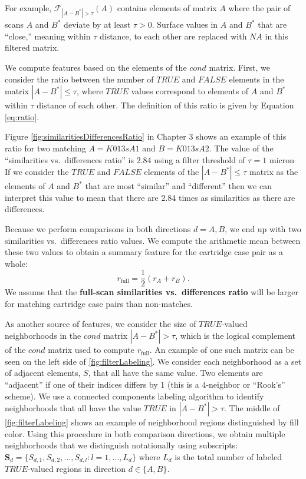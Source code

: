 \documentclass[11pt,]{isuthesis}
\begin{document}
For example, \(\mathcal{F}_{|A - B^*| > \tau}(A)\) contains elements of matrix \(A\) where the pair of scans \(A\) and \(B^*\) deviate by at least \(\tau > 0\).
Surface values in \(A\) and \(B^*\) that are ``close,'' meaning within \(\tau\) distance, to each other are replaced with \(NA\) in this filtered matrix.

We compute features based on the elements of the \(cond\) matrix.
First, we consider the ratio between the number of \(TRUE\) and \(FALSE\) elements in the matrix \(|A - B^*| \leq \tau\), where \(TRUE\) values correspond to elements of \(A\) and \(B^*\) within \(\tau\) distance of each other.
The definition of this ratio is given by Equation \eqref{eq:ratio}.

Figure \ref{fig:similaritiesDifferencesRatio} in Chapter 3 shows an example of this ratio for two matching \(A = K013sA1\) and \(B = K013sA2\).
The value of the ``similarities vs.~differences ratio'' is 2.84 using a filter threshold of \(\tau = 1\) micron
If we consider the \(TRUE\) and \(FALSE\) elements of the \(|A - B^*| \leq \tau\) matrix as the elements of \(A\) and \(B^*\) that are most ``similar'' and ``different'' then we can interpret this value to mean that there are 2.84 times as similarities as there are differences.

Because we perform comparisons in both directions \(d = A,B\), we end up with two similarities vs.~differences ratio values.
We compute the arithmetic mean between these two values to obtain a summary feature for the cartridge case pair as a whole:
\[
r_{\text{full}} = \frac{1}{2}(r_A + r_B).
\]
We assume that the \textbf{full-scan similarities vs.~differences ratio} will be larger for matching cartridge case pairs than non-matches.

As another source of features, we consider the size of \(TRUE\)-valued neighborhoods in the \(cond\) matrix \(|A - B^*| > \tau\), which is the logical complement of the \(cond\) matrix used to compute \(r_{\text{full}}\).
An example of one such matrix can be seen on the left side of \ref{fig:filterLabeling}.
We consider each neighborhood as a set of adjacent elements, \(S\), that all have the same value.
Two elements are ``adjacent'' if one of their indices differs by 1 (this is a 4-neighbor or ``Rook's'' scheme).
We use a connected components labeling algorithm \citep{hesselink_concurrent_2001} to identify neighborhoods that all have the value \(TRUE\) in \(|A - B^*| > \tau\).
The middle of \ref{fig:filterLabeling} shows an example of neighborhood regions distinguished by fill color.
Using this procedure in both comparison directions, we obtain multiple neighborhoods that we distinguish notationally using subscripts: \(\pmb{S}_d = \{S_{d,1}, S_{d,2}, ..., S_{d, l} : l = 1,...,L_d\}\) where \(L_d\) is the total number of labeled \(TRUE\)-valued regions in direction \(d \in \{A,B\}\).
\end{document}
